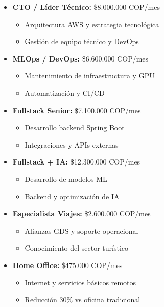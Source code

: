 \documentclass[12pt]{article}
\begin{document}
\begin{itemize}
    \item \textbf{CTO / Líder Técnico:} \$8.000.000 COP/mes
    \begin{itemize}
        \item Arquitectura AWS y estrategia tecnológica
        \item Gestión de equipo técnico y DevOps
    \end{itemize}
    
    \item \textbf{MLOps / DevOps:} \$6.600.000 COP/mes
    \begin{itemize}
        \item Mantenimiento de infraestructura y GPU
        \item Automatización y CI/CD
    \end{itemize}
    
    \item \textbf{Fullstack Senior:} \$7.100.000 COP/mes
    \begin{itemize}
        \item Desarrollo backend Spring Boot
        \item Integraciones y APIs externas
    \end{itemize}
    
    \item \textbf{Fullstack + IA:} \$12.300.000 COP/mes
    \begin{itemize}
        \item Desarrollo de modelos ML
        \item Backend y optimización de IA
    \end{itemize}
    
    \item \textbf{Especialista Viajes:} \$2.600.000 COP/mes
    \begin{itemize}
        \item Alianzas GDS y soporte operacional
        \item Conocimiento del sector turístico
    \end{itemize}
    
    \item \textbf{Home Office:} \$475.000 COP/mes
    \begin{itemize}
        \item Internet y servicios básicos remotos
        \item Reducción 30\% vs oficina tradicional
    \end{itemize}
\end{itemize}
\end{document}
